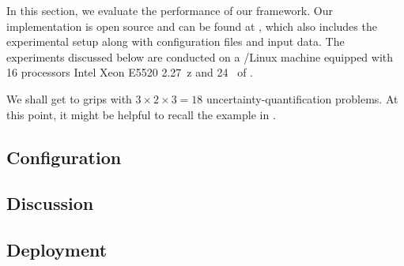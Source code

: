 In this section, we evaluate the performance of our framework. Our
implementation is open source and can be found at \cite{sources}, which also
includes the experimental setup along with configuration files and input data.
The experiments discussed below are conducted on a /Linux machine
equipped with 16 processors Intel Xeon E5520 2.27~z and 24~ of
.

We shall get to grips with $3 \times 2 \times 3 = 18$ uncertainty-quantification
problems.  At this point, it might be helpful to
recall the example in .

\subsection{Configuration} 


\subsection{Discussion}


\subsection{Deployment}

